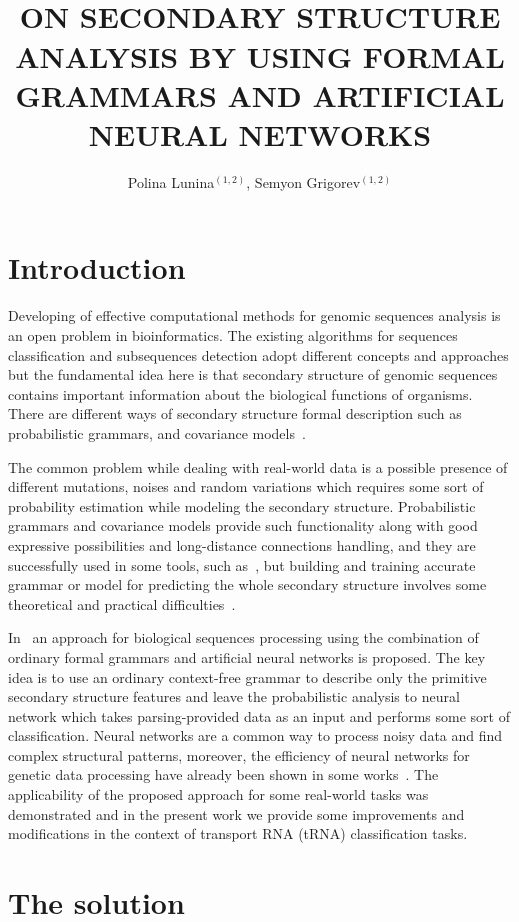 \documentclass[12pt,a4paper]{cibb}
\title{\large $\ $\\ \bf ON SECONDARY STRUCTURE ANALYSIS BY USING FORMAL GRAMMARS AND ARTIFICIAL NEURAL NETWORKS}
\author{ Polina Lunina$^{(1,2)}$, Semyon Grigorev$^{(1,2)}$}
\begin{document}
\thispagestyle{myheadings}
\pagestyle{myheadings}



\section{\bf Introduction}

Developing of effective computational methods for genomic sequences analysis is an open problem in bioinformatics.
The existing algorithms for sequences classification and subsequences detection adopt different concepts and approaches but the fundamental idea here is that secondary structure of genomic sequences contains important information about the biological functions of organisms.
There are different ways of secondary structure formal description such as probabilistic grammars, and covariance models~\cite{EddyDurbin,dowell2004evaluation,knudsen1999rna}.

The common problem while dealing with real-world data is a possible presence of different mutations, noises and random variations which requires some sort of probability estimation while modeling the secondary structure.
Probabilistic grammars and covariance models provide such functionality along with good expressive possibilities and long-distance connections handling, and they are successfully used in some tools, such as~\cite{Infernal}, but building and training accurate grammar or model for predicting the whole secondary structure involves some theoretical and practical difficulties~\cite{!!!}.

In~\cite{grigorevcomposition} an approach for biological sequences processing using the combination of ordinary formal grammars and artificial neural networks is proposed.
The key idea is to use an ordinary context-free grammar to describe only the primitive secondary structure features and leave the probabilistic analysis to neural network which takes parsing-provided data as an input and performs some sort of classification.
Neural networks are a common way to process noisy data and find complex structural patterns, moreover, the efficiency of neural networks for genetic data processing have already been shown in some works~\cite{Humidor,ANN}.
The applicability of the proposed approach for some real-world tasks was demonstrated and in the present work we provide some improvements and modifications in the context of transport RNA (tRNA) classification tasks.

\section{\bf The solution}
\end{document}
